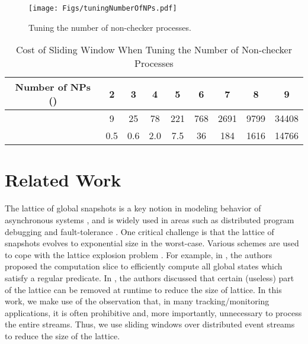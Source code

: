 \documentclass[12pt,journal,letterpaper,compsoc]{IEEEtran}
\begin{document}
\begin{figure}[htbp]
\begin{center}
  \texttt{[image: Figs/tuningNumberOfNPs.pdf]}\\
  \centering\parbox[c]{3.9in}{\caption{Tuning the number of non-checker processes.}}
  \label{F:number-of-NPs}
\end{center}
\end{figure}

\begin{table}[htbp]
\caption{Cost of Sliding Window When Tuning the Number of Non-checker Processes}
\label{T:cost of sliding window} \centering
\begin{tabular}{c|c|c|c|c|c|c|c|c}
\hline
Number of NPs () & 2 & 3 & 4 & 5 & 6 & 7 & 8 & 9 \\
\hline
\hline
 & 9 & 25 & 78 & 221 & 768 & 2691 & 9799 & 34408 \\
\hline
 & 0.5 & 0.6 & 2.0 & 7.5 & 36 & 184 & 1616 & 14766 \\
\hline
\end{tabular}
\end{table}

\section{Related Work}
\label{sec:related-work}

The lattice of global snapshots is a key notion in modeling behavior of asynchronous systems \cite{Schwarz94, Babaoglu96, Babaoglu95, Cooper91, Hua10, Huang09, Huang10a, Huang11, Mittal07, Sen07}, and is widely used in areas such as distributed program debugging \cite{Garg94, Garg96} and fault-tolerance \cite{Mittal05}. One critical challenge is that the lattice of snapshots evolves to exponential size in the worst-case. Various schemes are used to cope with the lattice explosion problem \cite{Mittal07, Sen07, Dumais02, Jard94, Chen11}. For example, in \cite{Mittal07, Sen07}, the authors proposed the computation slice to efficiently compute all global states which satisfy a regular predicate\cite{Mittal07}. In \cite{Jard94}, the authors discussed that certain (useless) part of the lattice can be removed at runtime to reduce the size of lattice. In this work, we make use of the observation that, in many tracking/monitoring applications, it is often prohibitive and, more importantly, unnecessary to process the entire streams. Thus, we use sliding windows over distributed event streams to reduce the size of the lattice.
\end{document}
